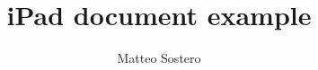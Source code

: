 \documentclass[12pt,titlepage]{article}
\author{Matteo Sostero}
\title{iPad document example}
\begin{document}
\maketitle

\clearpage

\tableofcontents

\clearpage

\blindmathpaper
\end{document}
